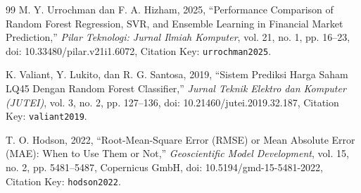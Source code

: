 \documentclass[10pt,a4paper]{article}
\begin{document}
\begin{thebibliography}{99}
M. Y. Urrochman dan F. A. Hizham, 2025, ``Performance Comparison of Random Forest Regression, SVR, and Ensemble Learning in Financial Market Prediction,'' \textit{Pilar Teknologi: Jurnal Ilmiah Komputer}, vol. 21, no. 1, pp. 16--23, doi: 10.33480/pilar.v21i1.6072, Citation Key: \texttt{urrochman2025}.

K. Valiant, Y. Lukito, dan R. G. Santosa, 2019, ``Sistem Prediksi Harga Saham LQ45 Dengan Random Forest Classifier,'' \textit{Jurnal Teknik Elektro dan Komputer (JUTEI)}, vol. 3, no. 2, pp. 127--136, doi: 10.21460/jutei.2019.32.187, Citation Key: \texttt{valiant2019}.

T. O. Hodson, 2022, ``Root-Mean-Square Error (RMSE) or Mean Absolute Error (MAE): When to Use Them or Not,'' \textit{Geoscientific Model Development}, vol. 15, no. 2, pp. 5481--5487, Copernicus GmbH, doi: 10.5194/gmd-15-5481-2022, Citation Key: \texttt{hodson2022}.

\end{thebibliography}
\endgroup
\end{document}
